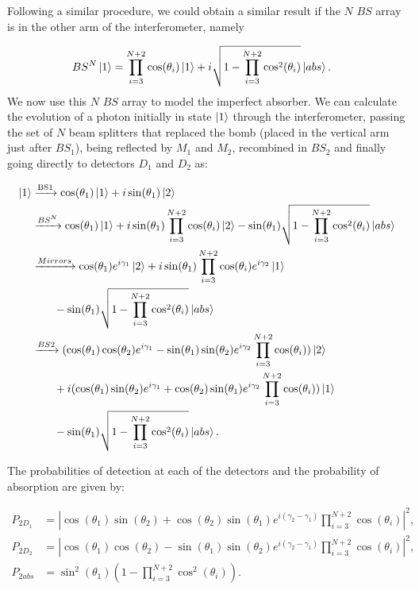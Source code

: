 \documentclass[12pt]{book}
\begin{document}
Following a similar procedure, we could obtain a similar result if the $N$ $BS$ array is in the other arm of the interferometer,  namely

\begin{align}
BS^{N}\ket{1}&=\prod_{i=3}^{N+2} \cos(\theta_{i})\ket{1}+i \sqrt{1-\prod_{i=3}^{N+2}\cos^2(\theta_{i})} \ket{abs}.
\end{align}
 We now use this $N$ $BS$ array to model the imperfect absorber. We can calculate the evolution of a photon initially in state $\ket{1}$ through the interferometer, passing the set of $N$ beam splitters that replaced the bomb (placed in the vertical arm just after $BS_1$), being reflected by $M_1$ and $M_2$, recombined in $BS_2$ and finally going directly to detectors $D_1$ and $D_2$ as: 


\begin{align*}
\ket{1}&\xrightarrow{\text{BS1}}\cos(\theta_{1})\ket{1}+i\sin(\theta_{1})\ket{2}\\ &\xrightarrow{{BS^{N}}}\cos(\theta_{1})\ket{1}+i\sin(\theta_{1})\prod_{i=3}^{N+2} \cos(\theta_{i})\ket{2}-\sin(\theta_{1})\sqrt{1-\prod_{i=3}^{N+2}\cos^2(\theta_{i})}\ket{abs} \\ & \xrightarrow{{Mirrors}}\cos(\theta_{1})  e^{i \gamma_{1}}\ket{2}+i\sin(\theta_{1})\prod_{i=3}^{N+2} \cos(\theta_{i}) e^{i \gamma_{2}}\ket{1}\\
& \qquad -\sin(\theta_{1})\sqrt{1-\prod_{i=3}^{N+2}\cos^2(\theta_{i})}\ket{abs} \\ & \xrightarrow{{BS2}}(\cos(\theta_{1})\cos(\theta_{2})e^{i \gamma_{1}}-\sin(\theta_{1})\sin(\theta_{2})e^{i \gamma_{2}}\prod_{i=3}^{N+2} \cos(\theta_{i}))\ket{2}\\ & \qquad + i(\cos(\theta_{1})\sin(\theta_{2})e^{i \gamma_{1}}+\cos(\theta_{2})\sin(\theta_{1})e^{i \gamma_{2}}\prod_{i=3}^{N+2} \cos(\theta_{i}))\ket{1}\\ & \qquad -\sin(\theta_{1})\sqrt{1-\prod_{i=3}^{N+2}\cos^2(\theta_{i})}\ket{abs}.
\end{align*}
 
The probabilities of detection at each of the detectors and the probability of absorption are given by:

\begin{align}
P_{2D_{1}}&=|\cos(\theta_{1})\sin(\theta_{2})+\cos(\theta_{2})\sin(\theta_{1})e^{i (\gamma_{2}-\gamma_{1})}\prod_{i=3}^{N+2} \cos(\theta_{i})|^2,\\
P_{2D_{2}}&=|\cos(\theta_{1})\cos(\theta_{2})-\sin(\theta_{1})\sin(\theta_{2})e^{i (\gamma_{2}-\gamma_{1})}\prod_{i=3}^{N+2} \cos(\theta_{i})|^2,\\
P_{2abs}&=\sin^2(\theta_{1})\left(1-\prod_{i=3}^{N+2}\cos^2(\theta_{i})\right).
\end{align}
\end{document}

